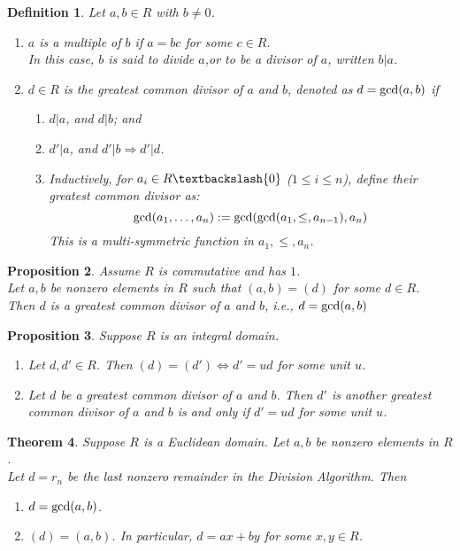 \documentclass[a4paper,8pt]{article}
\newcommand{\hlt}[1]{\textit{{\color{blue}#1}}}
\newcommand{\gcds}[1]{\textnormal{gcd}#1}
\theoremstyle{theorem}
\newtheorem{theorem}{Theorem}[subsection]
\newtheorem{proposition}[theorem]{Proposition}
\newtheorem{definition}[theorem]{Definition}
\begin{document}
\begin{definition}
Let $a, b \in R$ with $b \neq 0$.
\begin{enumerate}[label=(\roman*)]
\item $a$ is a \hlt{multiple} of $b$ if $a=bc$ for some $c \in R$.\\
In this case, $b$ is said to divide $a$,or to be a \hlt{divisor of $a$}, written $b|a$.
\item $d \in R$ is the \hlt{greatest common divisor of $a$ and $b$}, denoted as $d = \gcds(a,b)$ if
\begin{enumerate}[label=\alph*.]
\item $d|a$, and $d|b$; and
\item $d'|a$, and $d'|b \Rightarrow d'|d$.
\item Inductively, for $a_i \in R \textbackslash \{0\}$ ($1\leq i \leq n$), define their greatest common divisor as:
\begin{equation}
\gcds(a_1, \ldots, a_n) := \gcds(\gcds(a_1, \leq, a_{n-1}), a_n) \nonumber
\end{equation}
This is a multi-symmetric function in $a_1, \leq, a_n$.
\end{enumerate}
\end{enumerate}
\end{definition}

\begin{proposition}
Assume $R$ is commutative and has $1$.\\
Let $a, b$ be nonzero elements in $R$ such that $(a, b) = (d)$ for some $d \in R$.\\
Then $d$ is a greatest common divisor of $a$ and $b$, i.e., $d = \gcds(a,b)$
\end{proposition}

\begin{proposition}
Suppose $R$ is an integral domain.
\begin{enumerate}[label=(\roman*)]
\item Let $d, d' \in R$. Then $(d) = (d') \Leftrightarrow d' = ud$ for some unit $u$.
\item Let $d$ be a greatest common divisor of $a$ and $b$. Then $d'$ is another greatest common divisor of $a$ and $b$ is and only if $d' = ud$ for some unit $u$.
\end{enumerate}
\end{proposition}

\begin{theorem}
Suppose $R$ is a Euclidean domain. Let $a, b$ be nonzero elements in $R$.\\
Let $d = r_n$ be the last nonzero remainder in the Division Algorithm. Then
\begin{enumerate}[label=(\roman*)]
\item $d=\gcds(a,b)$.
\item $(d) = (a,b)$. In particular, $d=ax + by$ for some $x,y \in R$.
\end{enumerate}
\end{theorem}
\end{document}
